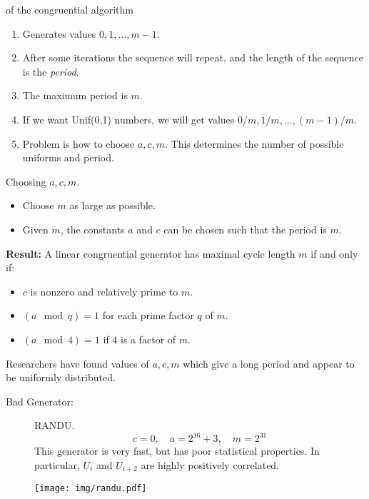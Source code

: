 \documentclass[captions=tableheading]{scrbook}
\begin{document}
\begin{description}
\item[Properties:] of the congruential algorithm
\begin{enumerate}
\item Generates values $0,1,\ldots,m-1$.
\item After some iterations the sequence will repeat, and the length of the sequence is the \emph{period}.
\item The maximum period is $m$.
\item If we want Unif(0,1) numbers, we will get values $0/m,1/m,\ldots,(m-1)/m$.
\item Problem is how to choose $a,c,m$. This determines the number of possible uniforms and period.
\end{enumerate}
\item[NUMBER THEORY RESULTS:] Choosing $a,c,m$.
\begin{itemize}
\item Choose $m$ as large as possible.
\item Given $m$, the constants $a$ and $c$ can be chosen such that the period is $m$.
\end{itemize}
\item\textbf{Result:} A linear congruential generator has maximal cycle length $m$ if and only if:
\begin{itemize}
\item $c$ is nonzero and relatively prime to $m$.
\item \( (a\mod q) = 1 \) for each prime factor $q$ of $m$.
\item \( (a\mod 4) = 1 \) if 4 is a factor of $m$.
\end{itemize}
\end{description}

Researchers have found values of $a,c,m$ which give a long period and appear to be uniformly distributed.


\begin{description}
\item[Bad Generator:] RANDU.  
  \[
  c = 0,\quad a=2^{16}+3,\quad m=2^{31}
  \]
  This generator is very fast, but has poor statistical properties. In particular, $U_{i}$ and $U_{i+2}$ are highly positively correlated.

   \begin{center}

   \texttt{[image: img/randu.pdf]}

   \end{center}
\end{description}
\end{document}
